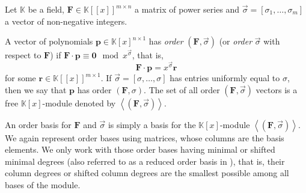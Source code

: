 Let $\mathbb{K}$ be a field, $\mathbf{F}\in\mathbb{K}\left[\left[x\right]\right]^{m\times n}$
a matrix of power series and $\vec{\sigma}=\left[\sigma_{1},\dots,\sigma_{m}\right]$
a vector of non-negative integers. 
\begin{defn}
A vector of polynomials $\mathbf{p}\in\mathbb{K}\left[x\right]^{n\times1}$
has \emph{order} $\left(\mathbf{F},\vec{\sigma}\right)$ (or \emph{order}
$\vec{\sigma}$ with respect to $\mathbf{F}$) if $\mathbf{F}\cdot\mathbf{p}\equiv\mathbf{0}\mod x^{\vec{\sigma}}$,
that is, 
\[
\mathbf{F}\cdot\mathbf{p}=x^{\vec{\sigma}}\mathbf{r}
\]
for some $\mathbf{r}\in\mathbb{K}\left[\left[x\right]\right]^{m\times1}$.
If $\vec{\sigma}=\left[\sigma,\dots,\sigma\right]$ has entries uniformly
equal to $\sigma$, then we say that $\mathbf{p}$ has order $\left(\mathbf{F},\sigma\right).$
The set of all order $\left(\mathbf{F},\vec{\sigma}\right)$ vectors
is a free $\mathbb{K}\left[x\right]$-module denoted by $\left\langle \left(\mathbf{F},\vec{\sigma}\right)\right\rangle $. 
\end{defn}
An order basis for $\mathbf{F}$ and $\vec{\sigma}$ is simply a basis
for the $\mathbb{K}\left[x\right]$-module $\left\langle \left(\mathbf{F},\vec{\sigma}\right)\right\rangle $.
We again represent order bases using matrices, whose columns are the
basis elements. We only work with those order bases having minimal
or shifted minimal degrees (also referred to as a reduced order basis
in \cite{BL1997}), that is, their column degrees or shifted column
degrees are the smallest possible among all bases of the module. 

